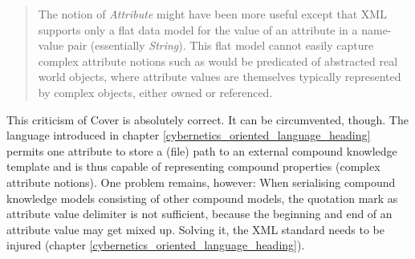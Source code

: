 \begin{quote}
    The notion of \emph{Attribute} might have been more useful except that XML
    supports only a flat data model for the value of an attribute in a
    name-value pair (essentially \emph{String}). This flat model cannot easily
    capture complex attribute notions such as would be predicated of abstracted
    real world objects, where attribute values are themselves typically
    represented by complex objects, either owned or referenced.
\end{quote}

This criticism of Cover is absolutely correct. It can be circumvented, though.
The language introduced in chapter \ref{cybernetics_oriented_language_heading}
permits one attribute to store a (file) path to an external compound knowledge
template and is thus capable of representing compound properties (complex
attribute notions). One problem remains, however: When serialising compound
knowledge models consisting of other compound models, the quotation mark as
attribute value delimiter is not sufficient, because the beginning and end of
an attribute value may get mixed up. Solving it, the XML standard needs to be
injured (chapter \ref{cybernetics_oriented_language_heading}).

